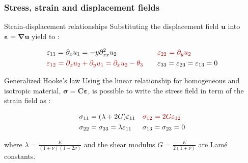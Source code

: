 \documentclass[aspectratio=169]{beamer}
\begin{document}
\begin{frame}
  \frametitle{Stress, strain and displacement fields}
  \begin{block}{Strain-displacement relationships}
    Substituting the displacement field $\mathbf u$ into $\boldsymbol{\varepsilon}=\boldsymbol\nabla\mathbf u$ yield to :
    \vspace{-0.6cm}

    \begin{align*}
      \varepsilon_{11}                      & =\partial_{x}u_{1}=-y\partial_{xx}^2u_{2}                                                & \textcolor{darkred}{\varepsilon_{22}} & \textcolor{darkred}{\ =\partial_{y}u_{2}} \\
      \textcolor{darkred}{\varepsilon_{12}} & \textcolor{darkred}{\ =\partial_{x}u_{2}+\partial_{y}u_{1}=\partial_{x}u_{2}-\theta_{3}} & \quad \varepsilon_{33}                & = \varepsilon_{23} = \varepsilon_{13} = 0
    \end{align*}
  \end{block}
  \begin{block}{Generalized Hooke's law}
    Using the linear relationship for homogeneous and isotropic material,
    $\boldsymbol\sigma=\mathbf C\boldsymbol\varepsilon$, is possible to write the stress field in term of the strain field as :
    \vspace{-0.6cm}

    \begin{align*}
      \sigma_{11}                      & =(\lambda + 2G)\varepsilon_{11}            &
      \textcolor{darkred}{\sigma_{12}} & \textcolor{darkred}{\ =2G\varepsilon_{12}}   \\
      \sigma_{22}                      & =\sigma_{33}=\lambda \varepsilon_{11}      &
      \sigma_{13}                      & = \sigma_{23} = 0
    \end{align*}

    where $\lambda=\frac{E}{(1+\nu)(1-2\nu)}$ and the shear modulus $G=\frac{E}{2(1+\nu)}$ are Lamé constants.
  \end{block}
\end{frame}
\end{document}
